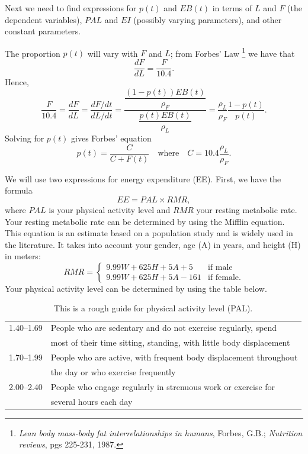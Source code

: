 Next we need to find expressions for $p(t)$ and $EB(t)$ in terms of $L$ and $F$ (the dependent variables), $PAL$ and $EI$ (possibly varying parameters), and other constant parameters.

 The proportion $p(t)$ will vary with $F$ and $L$; from Forbes' Law 
 \footnote{\emph{Lean body mass-body fat interrelationships in humans}, Forbes, G.B.; \emph{ Nutrition reviews}, pgs 225-231, 1987.}
 we have that
\begin{equation}
\label{eqn:forbes}
\dfrac{dF}{dL} = \dfrac{F}{10.4}.
\end{equation}
Hence,
\[
\dfrac{F}{10.4} = \dfrac{dF}{dL} = \dfrac{dF/dt}{dL/dt} = \dfrac{\dfrac{(1-p(t)) EB(t)}{\rho_F}}{\dfrac{p(t) EB(t)}{\rho_L}} = \dfrac{\rho_L}{\rho_F} \dfrac{1-p(t)}{p(t)}.
\]
Solving for $p(t)$ gives Forbes' equation
\begin{equation}
\label{eqn:Forbes2}
p(t) = \dfrac{C}{C+F(t)}\quad\mbox{where}\quad C=10.4\dfrac{\rho_L}{\rho_F}.
\end{equation}

We will use two expressions for energy expenditure (EE).
First, we have the formula
\begin{equation}
\label{eqn:EE0}
EE = PAL \times RMR,
\end{equation}
where $PAL$ is your physical activity level and $RMR$ your resting metabolic rate.
Your resting metabolic rate can be determined by using the Mifflin equation.
This equation is an estimate based on a population study and is widely used in the literature.
It takes into account your gender, age (A) in years, and height (H) in meters:
\begin{equation}
\label{eqn:RMR}
RMR = \begin{cases} 9.99 W + 625 H + 5 A + 5 & \mbox{if male}\\ 9.99 W + 625 H + 5 A -161 & \mbox{if female.}\end{cases}
\end{equation}
Your physical activity level can be determined by using the table below.
\begin{table}[h]
\begin{center}
\begin{tabular}{|l|l|}
\hline
1.40--1.69 & People who are sedentary and do not exercise regularly, spend \\
& most of their time sitting, standing, with little body displacement
\\
\hline
1.70--1.99 & People who are active, with frequent body displacement throughout  \\
& the day or who exercise frequently\\
\hline
2.00--2.40 & People who engage regularly in strenuous work or exercise for \\
& several hours each day\\
\hline
\end{tabular}
\caption{This is a rough guide for physical activity level (PAL).
}
\end{center}\label{tab:PAL_table}
\end{table}

